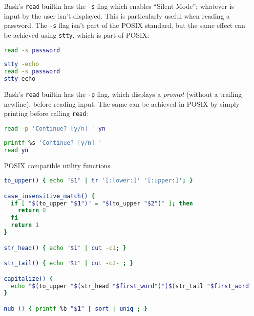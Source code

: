 \documentclass{article}
\begin{document}
Bash's {\tt read} builtin has the {\tt -s} flag which enables ``Silent Mode'': whatever is
input by the user isn't displayed. This is particularly useful when reading a
password. The {\tt -s} flag isn't part of the POSIX standard, but the same
effect can be achieved using {\tt stty}, which is part of POSIX:

\begin{minipage}[b]{.5\textwidth}
\begin{lstlisting}[language=sh]
read -s password
\end{lstlisting}
\end{minipage}%
\begin{minipage}[b]{.5\textwidth}
\begin{lstlisting}[language=bash]
stty -echo
read -s password
stty echo
\end{lstlisting}
\end{minipage}

Bash's {\tt read} builtin has the {\tt -p} flag, which displays a
\textit{prompt} (without a trailing newline), before reading input. The same can
be achieved in POSIX by simply printing before calling {\tt read}:

\begin{minipage}[t]{.5\textwidth}
\begin{lstlisting}[language=sh]
read -p 'Continue? [y/n] ' yn
\end{lstlisting}
\end{minipage}%
\begin{minipage}[t]{.5\textwidth}
\begin{lstlisting}[language=bash]
printf %s 'Continue? [y/n] '
read yn
\end{lstlisting}
\end{minipage}

POSIX compatible utility functions

\begin{lstlisting}[language=bash]
to_upper() { echo "$1" | tr '[:lower:]' '[:upper:]'; }

case_insensitive_match() {
  if [ "$(to_upper "$1")" = "$(to_upper "$2")" ]; then
    return 0
  fi
  return 1
}

str_head() { echo "$1" | cut -c1; }

str_tail() { echo "$1" | cut -c2- ; }

capitalize() {
  echo "$(to_upper "$(str_head "$first_word")")$(str_tail "$first_word")"
}

nub () { printf %b "$1" | sort | uniq ; }
\end{lstlisting}

\newpage 


\end{document}
